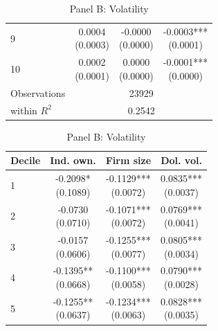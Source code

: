 \begin{table}[!htbp]
\begin{threeparttable}
\begin{minipage}[t]{0.46\textwidth}
\begin{subtable}[t]{\linewidth}
\begin{tabular}{@{}lccc@{}}
9 & \shortstack{0.0004\\(0.0003)} & \shortstack{-0.0000\\(0.0000)} & \shortstack{-0.0003***\\(0.0001)} \\
10 & \shortstack{0.0002\\(0.0001)} & \shortstack{0.0000\\(0.0000)} & \shortstack{-0.0001***\\(0.0000)} \\
\midrule
Observations & \multicolumn{3}{c}{23929} \\
within $R^2$ & \multicolumn{3}{c}{0.2542} \\
\bottomrule
\end{tabular}
\end{subtable}
\end{minipage}\hfill
\begin{minipage}[t]{0.46\textwidth}
\begin{subtable}[t]{\linewidth}
\caption{Panel B: Volatility}
\centering
\begin{tabular}{@{}lccc@{}}
\toprule
Decile & Ind. own. & Firm size & Dol. vol. \\
\midrule
1 & \shortstack{-0.2098*\\(0.1089)} & \shortstack{-0.1129***\\(0.0072)} & \shortstack{0.0835***\\(0.0037)} \\
2 & \shortstack{-0.0730\\(0.0710)} & \shortstack{-0.1071***\\(0.0072)} & \shortstack{0.0769***\\(0.0041)} \\
3 & \shortstack{-0.0157\\(0.0606)} & \shortstack{-0.1255***\\(0.0077)} & \shortstack{0.0805***\\(0.0034)} \\
4 & \shortstack{-0.1395**\\(0.0668)} & \shortstack{-0.1100***\\(0.0058)} & \shortstack{0.0790***\\(0.0028)} \\
5 & \shortstack{-0.1255**\\(0.0637)} & \shortstack{-0.1234***\\(0.0063)} & \shortstack{0.0828***\\(0.0035)} \\

\end{tabular}
\end{subtable}
\end{minipage}
\end{threeparttable}
\end{table}

